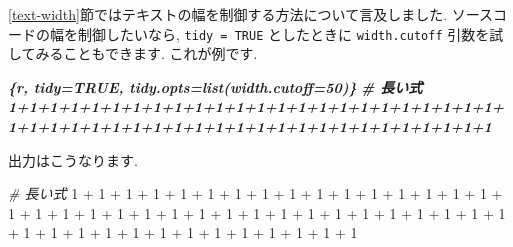 \documentclass[
  11pt,
]{bxjsreport}
\newenvironment{Shaded}{\begin{snugshade}}{\end{snugshade}}
\newcommand{\CommentTok}[1]{\textcolor[rgb]{0.56,0.35,0.01}{\textit{#1}}}
\newcommand{\DecValTok}[1]{\textcolor[rgb]{0.00,0.00,0.81}{#1}}
\newcommand{\InformationTok}[1]{\textcolor[rgb]{0.56,0.35,0.01}{\textbf{\textit{#1}}}}
\newcommand{\SpecialCharTok}[1]{\textcolor[rgb]{0.00,0.00,0.00}{#1}}
\begin{document}
\ref{text-width}節ではテキストの幅を制御する方法について言及しました. ソースコードの幅を制御したいなら, \texttt{tidy = TRUE} としたときに \texttt{width.cutoff} 引数を試してみることもできます. これが例です.

\begin{Shaded}
\begin{Highlighting}[]
\InformationTok{\textasciigrave{}\textasciigrave{}\textasciigrave{}\{r, tidy=TRUE, tidy.opts=list(width.cutoff=50)\}}
\InformationTok{\# 長い式}
\InformationTok{1+1+1+1+1+1+1+1+1+1+1+1+1+1+1+1+1+1+1+1+1+1+1+1+}
\InformationTok{1+1+1+1+1+1+1+1+1+1+1+1+1+1+1+1+1+1+1+1+1+1+1+1}
\InformationTok{\textasciigrave{}\textasciigrave{}\textasciigrave{}}
\end{Highlighting}
\end{Shaded}

出力はこうなります.

\begin{Shaded}
\begin{Highlighting}[numbers=left,,]
\CommentTok{\# 長い式}
\DecValTok{1} \SpecialCharTok{+} \DecValTok{1} \SpecialCharTok{+} \DecValTok{1} \SpecialCharTok{+} \DecValTok{1} \SpecialCharTok{+} \DecValTok{1} \SpecialCharTok{+} \DecValTok{1} \SpecialCharTok{+} \DecValTok{1} \SpecialCharTok{+} \DecValTok{1} \SpecialCharTok{+} \DecValTok{1} \SpecialCharTok{+} \DecValTok{1} \SpecialCharTok{+} \DecValTok{1} \SpecialCharTok{+} \DecValTok{1} \SpecialCharTok{+} \DecValTok{1} \SpecialCharTok{+} 
  \DecValTok{1} \SpecialCharTok{+} \DecValTok{1} \SpecialCharTok{+} \DecValTok{1} \SpecialCharTok{+} \DecValTok{1} \SpecialCharTok{+} \DecValTok{1} \SpecialCharTok{+} \DecValTok{1} \SpecialCharTok{+} \DecValTok{1} \SpecialCharTok{+} \DecValTok{1} \SpecialCharTok{+} \DecValTok{1} \SpecialCharTok{+} \DecValTok{1} \SpecialCharTok{+} \DecValTok{1} \SpecialCharTok{+} \DecValTok{1} \SpecialCharTok{+} 
  \DecValTok{1} \SpecialCharTok{+} \DecValTok{1} \SpecialCharTok{+} \DecValTok{1} \SpecialCharTok{+} \DecValTok{1} \SpecialCharTok{+} \DecValTok{1} \SpecialCharTok{+} \DecValTok{1} \SpecialCharTok{+} \DecValTok{1} \SpecialCharTok{+} \DecValTok{1} \SpecialCharTok{+} \DecValTok{1} \SpecialCharTok{+} \DecValTok{1} \SpecialCharTok{+} \DecValTok{1} \SpecialCharTok{+} \DecValTok{1} \SpecialCharTok{+} 
  \DecValTok{1} \SpecialCharTok{+} \DecValTok{1} \SpecialCharTok{+} \DecValTok{1} \SpecialCharTok{+} \DecValTok{1} \SpecialCharTok{+} \DecValTok{1} \SpecialCharTok{+} \DecValTok{1} \SpecialCharTok{+} \DecValTok{1} \SpecialCharTok{+} \DecValTok{1} \SpecialCharTok{+} \DecValTok{1} \SpecialCharTok{+} \DecValTok{1} \SpecialCharTok{+} \DecValTok{1}
\end{Highlighting}
\end{Shaded}
\end{document}
